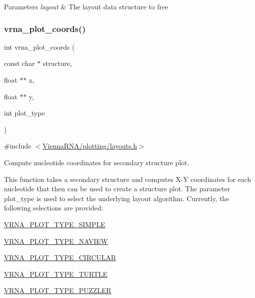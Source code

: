 \begin{DoxyParams}{Parameters}
{\em layout} & The layout data structure to free \\
\hline
\end{DoxyParams}
\mbox{\label{group__plot__layout__utils_ga2e2adbef0283a8ff2dfe5284eb1f4a6a}} 
\subsubsection{\texorpdfstring{vrna\_plot\_coords()}{vrna\_plot\_coords()}}
{\footnotesize\ttfamily int vrna\+\_\+plot\+\_\+coords (\begin{DoxyParamCaption}\item[{const char $\ast$}]{structure,  }\item[{float $\ast$$\ast$}]{x,  }\item[{float $\ast$$\ast$}]{y,  }\item[{int}]{plot\+\_\+type }\end{DoxyParamCaption})}



{\ttfamily \#include $<$\mbox{\hyperlink{layouts_8h}{Vienna\+R\+N\+A/plotting/layouts.\+h}}$>$}



Compute nucleotide coordinates for secondary structure plot. 

This function takes a secondary structure and computes X-\/Y coordinates for each nucleotide that then can be used to create a structure plot. The parameter {\ttfamily plot\+\_\+type} is used to select the underlying layout algorithm. Currently, the following selections are provided\+:
\begin{DoxyItemize}
\item \mbox{\hyperlink{group__plot__layout__utils_gae6d17b9f0a53cf5205a9181e0f8422e9}{V\+R\+N\+A\+\_\+\+P\+L\+O\+T\+\_\+\+T\+Y\+P\+E\+\_\+\+S\+I\+M\+P\+LE}}
\item \mbox{\hyperlink{group__plot__layout__utils_ga94d4c863ecac2f220f76658afb92f964}{V\+R\+N\+A\+\_\+\+P\+L\+O\+T\+\_\+\+T\+Y\+P\+E\+\_\+\+N\+A\+V\+I\+EW}}
\item \mbox{\hyperlink{group__plot__layout__utils_ga8c9eac631348da92136c8363ecdd9fb9}{V\+R\+N\+A\+\_\+\+P\+L\+O\+T\+\_\+\+T\+Y\+P\+E\+\_\+\+C\+I\+R\+C\+U\+L\+AR}}
\item \mbox{\hyperlink{group__plot__layout__utils_ga382c1c5c0b1943500aa4bb55b7658a33}{V\+R\+N\+A\+\_\+\+P\+L\+O\+T\+\_\+\+T\+Y\+P\+E\+\_\+\+T\+U\+R\+T\+LE}}
\item \mbox{\hyperlink{group__plot__layout__utils_ga64ec68055e241d11f659edb50f27ecae}{V\+R\+N\+A\+\_\+\+P\+L\+O\+T\+\_\+\+T\+Y\+P\+E\+\_\+\+P\+U\+Z\+Z\+L\+ER}}
\end{DoxyItemize}


